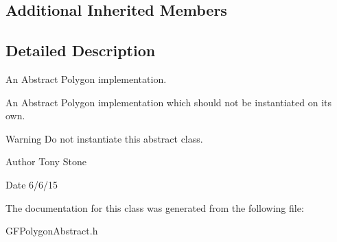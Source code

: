 \subsection*{Additional Inherited Members}


\subsection{Detailed Description}
An Abstract Polygon implementation. 

An Abstract Polygon implementation which should not be instantiated on it\textquotesingle{}s own.

\begin{DoxyWarning}{Warning}
Do not instantiate this abstract class.
\end{DoxyWarning}
\begin{DoxyAuthor}{Author}
Tony Stone 
\end{DoxyAuthor}
\begin{DoxyDate}{Date}
6/6/15 
\end{DoxyDate}


The documentation for this class was generated from the following file\+:\begin{DoxyCompactItemize}
\item 
G\+F\+Polygon\+Abstract.\+h\end{DoxyCompactItemize}
